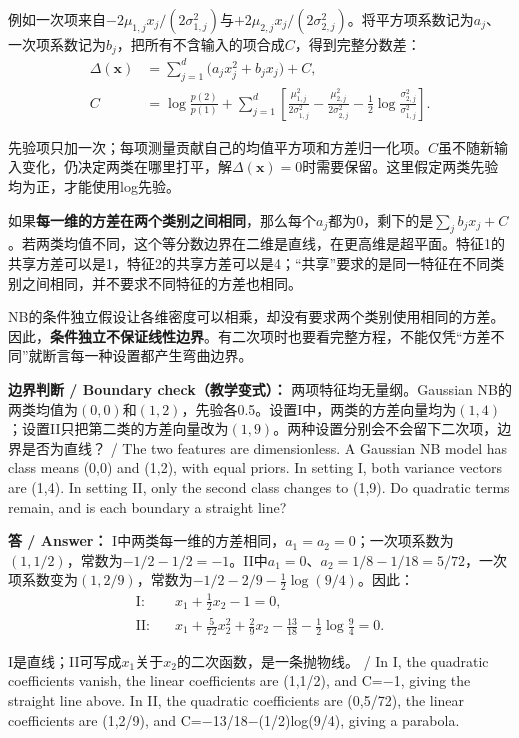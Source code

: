 例如一次项来自\(-2\mu_{1,j}x_j/(2\sigma_{1,j}^2)\)与\(+2\mu_{2,j}x_j/(2\sigma_{2,j}^2)\)。将平方项系数记为\(a_j\)、一次项系数记为\(b_j\)，把所有不含输入的项合成\(C\)，得到完整分数差：
\[
\begin{aligned}
\Delta(\mathbf x)&=\sum_{j=1}^d\bigl(a_jx_j^2+b_jx_j\bigr)+C,\\[3pt]
C&=\log\frac{p(2)}{p(1)}
 +\sum_{j=1}^d\left[
 \frac{\mu_{1,j}^2}{2\sigma_{1,j}^2}
 -\frac{\mu_{2,j}^2}{2\sigma_{2,j}^2}
 -\frac12\log\frac{\sigma_{2,j}^2}{\sigma_{1,j}^2}\right].
\end{aligned}\tag{2.16b}
\]


先验项只加一次；每项测量贡献自己的均值平方项和方差归一化项。\(C\)虽不随新输入变化，仍决定两类在哪里打平，解\(\Delta(\mathbf x)=0\)时需要保留。这里假定两类先验均为正，才能使用log先验。


如果\textbf{每一维的方差在两个类别之间相同}，那么每个\(a_j\)都为0，剩下的是\(\sum_j b_jx_j+C\)。若两类均值不同，这个等分数边界在二维是直线，在更高维是超平面。特征1的共享方差可以是1，特征2的共享方差可以是4；“共享”要求的是同一特征在不同类别之间相同，并不要求不同特征的方差也相同。


NB的条件独立假设让各维密度可以相乘，却没有要求两个类别使用相同的方差。因此，\textbf{条件独立不保证线性边界}。有二次项时也要看完整方程，不能仅凭“方差不同”就断言每一种设置都产生弯曲边界。



\textbf{边界判断 / Boundary check（教学变式）：} 两项特征均无量纲。Gaussian NB的两类均值为\((0,0)\)和\((1,2)\)，先验各0.5。设置I中，两类的方差向量均为\((1,4)\)；设置II只把第二类的方差向量改为\((1,9)\)。两种设置分别会不会留下二次项，边界是否为直线？ / The two features are dimensionless. A Gaussian NB model has class means (0,0) and (1,2), with equal priors. In setting I, both variance vectors are (1,4). In setting II, only the second class changes to (1,9). Do quadratic terms remain, and is each boundary a straight line?


\textbf{答 / Answer：} I中两类每一维的方差相同，\(a_1=a_2=0\)；一次项系数为\((1,1/2)\)，常数为\(-1/2-1/2=-1\)。II中\(a_1=0\)、\(a_2=1/8-1/18=5/72\)，一次项系数变为\((1,2/9)\)，常数为\(-1/2-2/9-\tfrac12\log(9/4)\)。因此：
\[
\begin{aligned}
\text{I:}\quad &x_1+\tfrac12x_2-1=0,\\[3pt]
\text{II:}\quad &x_1+\tfrac5{72}x_2^2+\tfrac29x_2
 -\tfrac{13}{18}-\tfrac12\log\tfrac94=0.
\end{aligned}\tag{2.16c}
\]


I是直线；II可写成\(x_1\)关于\(x_2\)的二次函数，是一条抛物线。 / In I, the quadratic coefficients vanish, the linear coefficients are (1,1/2), and C=\ensuremath{-}1, giving the straight line above. In II, the quadratic coefficients are (0,5/72), the linear coefficients are (1,2/9), and C=\ensuremath{-}13/18\ensuremath{-}(1/2)log(9/4), giving a parabola.



